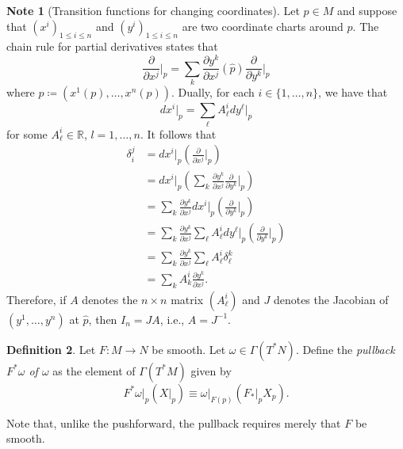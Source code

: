 \documentclass[10pt,letterpaper,cm]{nupset}
\theoremstyle{definition}
\newtheorem{definition}{Definition}[subsection]
\newtheorem{note}[definition]{Note}
\theoremstyle{theorem}
\theoremstyle{remark}
\newcommand{\R}{\mathbb R}
\newcommand{\1}{\mathbf{1}}
\newcommand{\0}{\vec 0}
\begin{document}
\begin{note}[Transition functions for changing coordinates]
Let $p\in M$ and suppose that $\left(x^i\right)_{1\leq i \leq n}$ and $\left(y^i\right)_{1\leq i \leq n}$ are two coordinate charts around $p$. The chain rule for partial derivatives states that
\[
 \frac{\partial}{\partial{x^j}}\bigr\rvert_p =   \sum_k\frac{\partial y^{k}}{\partial x^{j}}(\hat{p}) \frac{\partial}{\partial y^{k}}\bigr\rvert_p
\] where $\hat{p} \coloneqq \left(x^1(p), \ldots, x^n(p)\right)$.  Dually, for each $i \in \{1, \ldots, n\}$, we have that
\[
d{x^i}\bigr\rvert_p = \sum_{\ell} A_{\ell}^id{y^{\ell}}\bigr\rvert_p
\] for some $A^i_{\ell} \in \R$, $l =1, \ldots, n$. It follows  that
\begin{align*}
 \delta_i^j 
 &=d x^{i}\bigr\rvert_{p}\left(\frac{\partial}{\partial x^{j}}\bigr\rvert_{p}\right) 
 \\ &=d x^{i}\bigr\rvert_{p}\left(\sum_{k} \frac{\partial y^{k}}{\partial x^{j}} \frac{\partial}{\partial y^{k}}\bigr\rvert_{p}\right) 
 \\ &=\sum_{k} \frac{\partial y^{k}}{\partial x^{j}} d x^{i}\bigr\rvert_{p}\left(\frac{\partial}{\partial y^{k}}\bigr\rvert_{ p }\right)
\\ & = 
\sum_{k} \frac{\partial y^{k}}{\partial x^{j}} \sum_{\ell} A_{\ell}^{i} d y^{\ell}\bigr\rvert_{p}\left(\frac{\partial}{\partial y^{k}}\bigr\rvert_{ p }\right)
\\ & = \sum_{k} \frac{\partial y^{k}}{\partial x^{j}} \sum_{\ell} A_{\ell}^{i} \delta_{\ell}^k
\\ &  =\sum_{k} A_{k}^{i}\frac{\partial y^{k}}{\partial x^{j}}
. \end{align*} 
Therefore, if $A$ denotes the $n\times n$ matrix $\left(A_{\ell}^i\right)$ and $J$ denotes the Jacobian of $\left(y^1, \ldots, y^n\right)$ at $\hat{p}$, then $I_n = JA$, i.e., $A = J^{-1}$.
\end{note}

\bigskip

\begin{definition}\label{pullback}
Let $F: M \to N$ be smooth. Let $\omega \in \Gamma(T^{\ast}N)$. Define the \textit{pullback $F^{\ast}\omega$ of $\omega$}  as the  element of $\Gamma(T^{\ast}M)$ given by $$F^{\ast}\omega \bigr\rvert_p \left(X \bigr\rvert_p\right) \equiv \omega \bigr\rvert_{F(p)}\left(F_{\ast}\bigr\rvert_p X_p\right).$$ 
\end{definition}

Note that, unlike the pushforward, the pullback requires merely that $F$ be smooth. 
\end{document}
